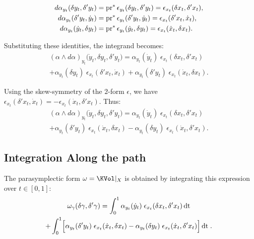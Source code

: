 \documentclass[11pt,reqno,letterpaper,twoside]{amsart}
\begin{document}
  \begin{align*}
    d\alpha_{y_t}(\delta y_t, \delta' y_t)
    &= \pr^*\epsilon_{y_t}(\delta y_t, \delta' y_t)
    = \epsilon_{x_t}(\delta x_t, \delta' x_t), \\
    d\alpha_{y_t}(\delta' y_t, \dot y_t)
    &= \pr^*\epsilon_{y_t}(\delta' y_t, \dot y_t)
    = \epsilon_{x_t}(\delta' x_t, \dot x_t), \\
    d\alpha_{y_t}(\dot y_t, \delta y_t)
    &= \pr^*\epsilon_{y_t}(\dot y_t, \delta y_t)
    = \epsilon_{x_t}(\dot x_t, \delta x_t).
  \end{align*}
  
  Substituting these identities,
  the integrand becomes:
  \begin{multline*}
    (\alpha \wedge d\alpha)_{y_t}\bigl( \dot y_t, \delta y_t, \delta' y_t \bigr)
    = \alpha_{y_t}(\dot y_t) \; \epsilon_{x_t}(\delta x_t, \delta' x_t) \\
    + \alpha_{y_t}(\delta y_t) \; \epsilon_{x_t}(\delta' x_t, \dot x_t)
    + \alpha_{y_t}(\delta' y_t) \; \epsilon_{x_t}(\dot x_t, \delta x_t).
  \end{multline*}
  
  Using the skew-symmetry of the $2$-form $\epsilon$,
  we have $\epsilon_{x_t}(\delta' x_t, \dot x_t) = -\epsilon_{x_t}(\dot x_t, \delta' x_t)$.
  Thus:
  \begin{multline*}
    (\alpha \wedge d\alpha)_{y_t}\bigl( \dot y_t, \delta y_t, \delta' y_t \bigr)
    = \alpha_{y_t}(\dot y_t) \; \epsilon_{x_t}(\delta x_t, \delta' x_t) \\
    + \alpha_{y_t}(\delta' y_t) \; \epsilon_{x_t}(\dot x_t, \delta x_t)
    - \alpha_{y_t}(\delta y_t) \; \epsilon_{x_t}(\dot x_t, \delta' x_t).
  \end{multline*}
  
  \subsection{Integration Along the path}
  
  The parasymplectic form $\omega = \KVol|_X$ is obtained by integrating
  this expression over $t \in [0,1]$:
  \begin{multline*}
    \omega_\gamma(\delta\gamma, \delta'\gamma) = \int_0^1 \alpha_{y_t}(\dot y_t) \; \epsilon_{x_t}(\delta x_t, \delta' x_t) \, \mathrm{dt} \\
    + \int_0^1 \Bigl[ \alpha_{y_t}(\delta' y_t) \; \epsilon_{x_t}(\dot x_t, \delta x_t) - \alpha_{y_t}(\delta y_t) \; \epsilon_{x_t}(\dot x_t, \delta' x_t) \Bigr] \, \mathrm{dt} \;.
  \end{multline*}
  
\end{document}

